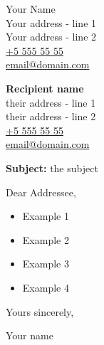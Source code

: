 \documentclass{letter}
\begin{document}
\begin{flushright}
Your Name\\
Your address - line 1\\
Your address - line 2\\
\href{tel:55555555}{+5 555 55 55}\\
\href{mailto:email@domain.com}{email@domain.com}
\end{flushright}

\vspace*{2\baselineskip}

\begin{flushleft}
\textbf{Recipient name}\\
their address - line 1\\
their address - line 2\\
\href{tel:55555555}{+5 555 55 55}\\
\href{mailto:email@domain.com}{email@domain.com}


\vspace*{4\baselineskip}

\textbf{Subject:} the subject 

\vspace*{2\baselineskip}



Dear Addressee,\par

\lipsum[1-2]

\begin{itemize}
	\item Example 1
	\item Example 2
	\item Example 3
	\item Example 4
\end{itemize}

\lipsum[4]

\vspace*{2\baselineskip}

Yours sincerely,

Your name

\end{flushleft}
\end{document}
